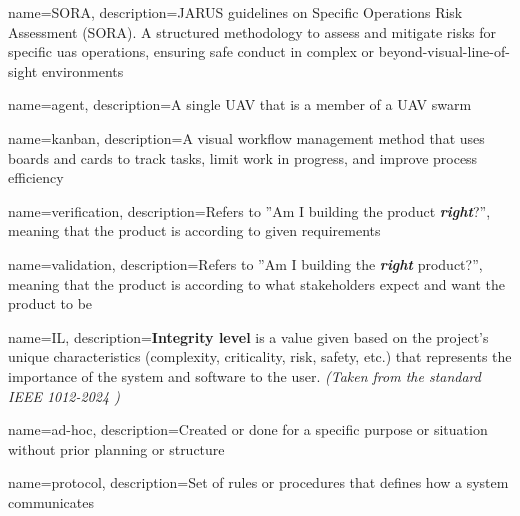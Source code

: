 {
        name=SORA,
        description={JARUS guidelines on Specific Operations Risk Assessment (SORA). A structured methodology to assess and mitigate risks for specific \acrshort{uas} operations, ensuring safe conduct in complex or beyond-visual-line-of-sight environments}
}


{
        name=agent,
        description={A single UAV that is a member of a UAV swarm}
}

{
        name=kanban,
        description={A visual workflow management method that uses boards and cards to track tasks, limit work in progress, and improve process efficiency}
}

{
        name=verification,
        description={Refers to ''Am I building the product \textbf{\textit{right}}?'', meaning that the product is according to given requirements}
}

{
        name=validation,
        description={Refers to ''Am I building the \textbf{\textit{right}} product?'', meaning that the product is according to what stakeholders expect and want the product to be}
}

{
		name=IL,
		description={\textbf{Integrity level} is a value given based on the project's unique characteristics (complexity, criticality, risk, safety, etc.) that represents the importance of the system and software to the user. \textit{(Taken from the standard IEEE 1012-2024 \cite{1012-2024})}}
}

{
        name=ad-hoc,
        description={Created or done for a specific purpose or situation without prior planning or structure}
}

{
        name=protocol,
        description={Set of rules or procedures that defines how a system communicates}
}




